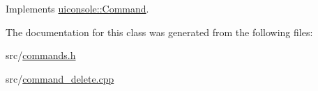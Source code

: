 Implements \hyperlink{classuiconsole_1_1Command_a5c4d205b1de13a6b3d0db73ddc7ebefa}{uiconsole::Command}.



The documentation for this class was generated from the following files:\begin{DoxyCompactItemize}
\item 
src/\hyperlink{commands_8h}{commands.h}\item 
src/\hyperlink{command__delete_8cpp}{command\_\-delete.cpp}\end{DoxyCompactItemize}
